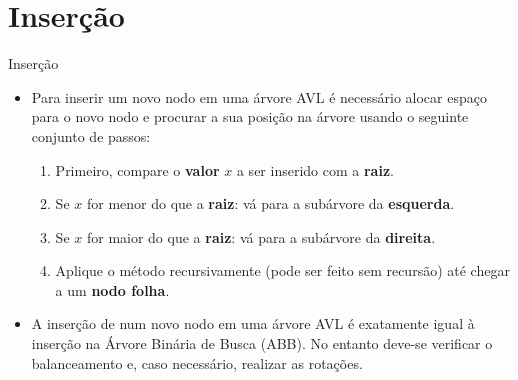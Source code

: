\documentclass[aspectratio=169]{beamer}
\begin{document}

\section{Inserção}


\begin{frame}{Inserção}
\begin{itemize}
 \item Para inserir um novo nodo em uma árvore AVL é necessário alocar espaço para o novo nodo e procurar a sua posição na árvore usando o seguinte conjunto de passos:
 \begin{enumerate}
  \item Primeiro, compare o {\bf valor} $x$ a ser inserido com a {\bf raiz}.
  \item Se $x$ for menor do que a {\bf raiz}: vá para a subárvore da {\bf esquerda}.
  \item Se $x$ for maior do que a {\bf raiz}: vá para a subárvore da {\bf direita}.
  \item Aplique o método recursivamente (pode ser feito sem recursão) até chegar a um {\bf nodo folha}.
 \end{enumerate}
 \item A inserção de num novo nodo em uma árvore AVL é exatamente igual à inserção na Árvore Binária de Busca (ABB). No entanto deve-se verificar o balanceamento e, caso necessário, realizar as rotações.
\end{itemize}
\end{frame}
\end{document}
